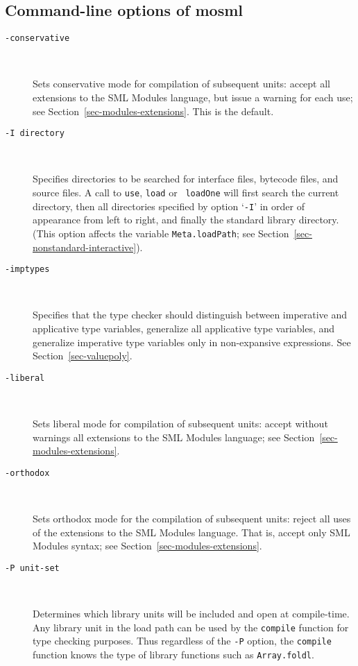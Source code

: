 \documentclass[fleqn,a4paper]{article}
\begin{document}
\subsection{Command-line options of mosml}
\label{sec-mosml-options}

\begin{description}
\item[{\tt -conservative}]\mbox{ }
  
  Sets conservative mode for compilation of subsequent units: accept
  all extensions to the SML Modules language, but issue a warning for
  each use; see Section~\ref{sec-modules-extensions}.  This is the
  default.

\item[{\tt -I {\rm directory}}]\mbox{ }

  Specifies directories to be searched for interface files, bytecode
  files, and source files.  A call to {\tt use}, {\tt load} or {\tt
    loadOne} will first search the current directory, then all
  directories specified by option `{\tt -I}' in order of appearance
  from left to right, and finally the standard library directory.
  (This option affects the variable {\tt Meta.loadPath}; see
  Section~\ref{sec-nonstandard-interactive}).

\item[{\tt -imptypes}]\mbox{ }

  Specifies that the type checker should distinguish between
  imperative and applicative type variables, generalize all
  applicative type variables, and generalize imperative type variables
  only in non-expansive expressions.  See Section~\ref{sec-valuepoly}.

\item[{\tt -liberal}]\mbox{ }
  
  Sets liberal mode for compilation of subsequent units: accept
  without warnings all extensions to the SML Modules language; see
  Section~\ref{sec-modules-extensions}.

\item[{\tt -orthodox}]\mbox{ }
  
  Sets orthodox mode for the compilation of subsequent units: reject
  all uses of the extensions to the SML Modules language.  That is,
  accept only SML Modules syntax; see
  Section~\ref{sec-modules-extensions}.

\item[{\tt -P {\rm unit-set}}]\mbox{ }

  Determines which library units will be included and open at
  compile-time.  Any library unit in the load path can be used by the
  {\tt compile} function for type checking purposes.  Thus regardless
  of the {\tt -P} option, the {\tt compile} function knows the type of
  library functions such as {\tt Array.foldl}.


\end{description}
\end{document}
